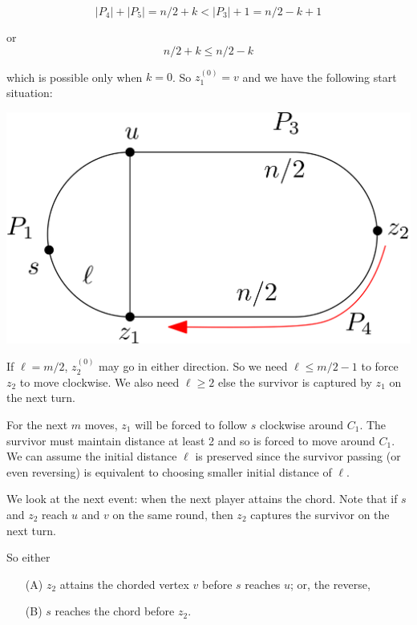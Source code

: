 \documentclass[letterpaper, 10pt]{article}
\begin{document}
\begin{enumerate}
       \[ |P_4| + |P_5| = n/2 + k < |P_3| + 1 = n/2 -k +1 \]

       or
       \[ n/2 +k \leq n/2 -k \]

       which is possible only when $k=0$. So $z_1^{(0)} = v$ and we have the following
       start situation:

       \begin{center}
        \includegraphics[scale=0.15]{diagramCaseI_3}
       \end{center}

       If $\ell = m/2$, $z_2^{(0)}$ may go in either direction.
       So we need $\ell \leq m/2 -1$ to force $z_2$ to move clockwise. We also need $\ell \geq 2$ else the survivor is captured by $z_1$
       on the next turn.

       For the next $m$ moves, $z_1$ will be forced to follow $s$ clockwise around $C_1$.
       The survivor must maintain distance at least 2 and so is forced to move around $C_1$. We can assume
       the initial distance $\ell$ is preserved since the survivor passing (or even reversing)
       is equivalent to choosing smaller initial distance of $\ell$.

       We look at the next event: when the next player attains the chord.
       Note that if $s$ and $z_2$ reach $u$ and $v$ on the same round, then $z_2$ captures
       the survivor on the next turn.

       So either
       \begin{enumerate}
        \item[(A)] $z_2$ attains the chorded vertex $v$ before $s$ reaches $u$; or, the reverse,
        \item[(B)] $s$ reaches the chord before $z_2$.
       \end{enumerate}


\end{enumerate}
\end{document}
